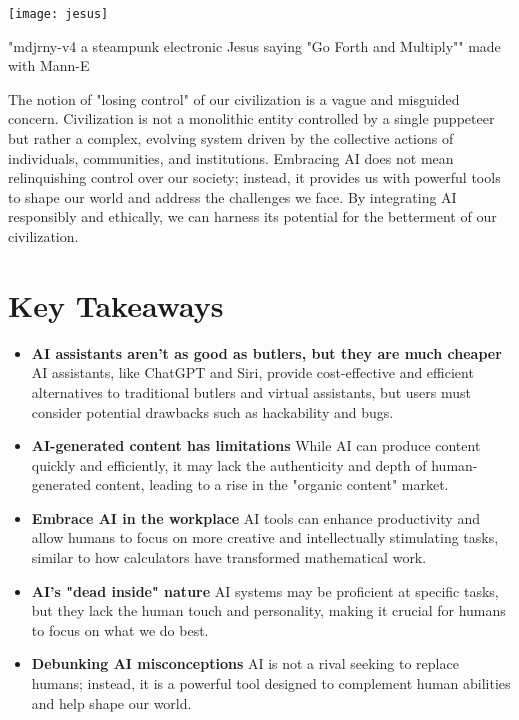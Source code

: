 \begin{marginfigure}[-5.5cm]
        \texttt{[image: jesus]}
        \caption{"mdjrny-v4 a steampunk electronic Jesus saying "Go Forth and Multiply"" made with Mann-E}
\end{marginfigure}

The notion of "losing control" of our civilization is a vague and misguided concern. Civilization is not a monolithic entity controlled by a single puppeteer but rather a complex, evolving system driven by the collective actions of individuals, communities, and institutions. Embracing AI does not mean relinquishing control over our society; instead, it provides us with powerful tools to shape our world and address the challenges we face. By integrating AI responsibly and ethically, we can harness its potential for the betterment of our civilization.

\section{Key Takeaways}

\begin{itemize}
\item \textbf{AI assistants aren't as good as butlers, but they are much cheaper} AI assistants, like ChatGPT and Siri, provide cost-effective and efficient alternatives to traditional butlers and virtual assistants, but users must consider potential drawbacks such as hackability and bugs.
\item \textbf{AI-generated content has limitations} While AI can produce content quickly and efficiently, it may lack the authenticity and depth of human-generated content, leading to a rise in the "organic content" market.
\item \textbf{Embrace AI in the workplace} AI tools can enhance productivity and allow humans to focus on more creative and intellectually stimulating tasks, similar to how calculators have transformed mathematical work.
\item \textbf{AI's "dead inside" nature} AI systems may be proficient at specific tasks, but they lack the human touch and personality, making it crucial for humans to focus on what we do best.
\item \textbf{Debunking AI misconceptions} AI is not a rival seeking to replace humans; instead, it is a powerful tool designed to complement human abilities and help shape our world.
\end{itemize}
